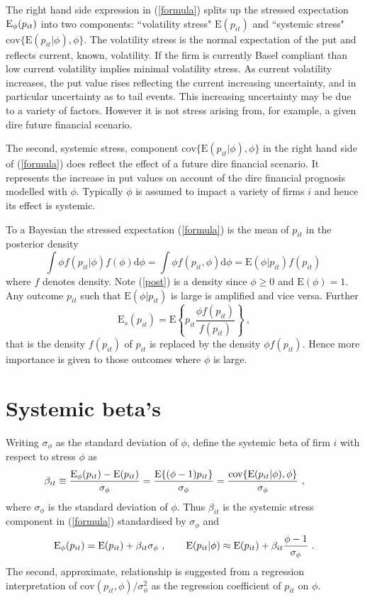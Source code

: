 \documentclass[authoryear]{elsarticle}
\newcommand{\E}{\mathrm{E}}
\newcommand{\cov}{\mathrm{cov}}
\newcommand{\de}{\mathrm{d}}
\newcommand{\eref}[1]{(\ref{#1})}
\newcommand{\cq}{\ , \qquad}
\newcommand{\be}[1]{\begin{equation}\label{#1}}
\newcommand{\ee}{\end{equation}}
\begin{document}
The right hand side expression in \eref{formula} splits up the stressed expectation $\Es(p_{it})$ into two components:   ``volatility stress"  $\E(p_{it})$ and ``systemic stress" $\cov\{\E(p_{it}|\phi),\phi\}$.  The volatility stress is the normal expectation of the put and reflects current, known, volatility.   If the firm is currently Basel compliant than low current volatility implies minimal volatility stress.   As current volatility increases, the put value rises reflecting the current increasing uncertainty, and in particular uncertainty as to tail events.  This increasing uncertainty may be due to a variety of factors.   However it is not  stress arising from, for example, a given dire future financial scenario.

The second, systemic stress, component $\cov\{\E(p_{it}|\phi),\phi\}$ in the right hand side of \eref{formula} does reflect the effect of a future dire financial scenario.  It represents the increase in put values on account of the dire financial prognosis modelled with $\phi$.  Typically $\phi$ is assumed to impact a variety of firms $i$ and hence its effect is systemic.


  To a Bayesian the stressed expectation \eref{formula}  is the mean of $p_{it}$  in  the posterior density
\be{post}
\int \phi f(p_{it}|\phi) f(\phi)\de \phi=\int \phi f(p_{it},\phi)\de \phi= \E(\phi|p_{it})f(p_{it})\ 
\ee
where $f$ denotes density.
Note \eref{post} is a density since $\phi\ge 0$ and $\E(\phi)=1$.   Any outcome $p_{it}$ such that $\E(\phi|p_{it})$ is large  is amplified and vice versa.   Further
$$
\E_s(p_{it})  = \E\left\{p_{it} \frac{\phi f(p_{it})}{f(p_{it})}\right\}\ ,
$$
that is the density  $f(p_{it})$ of $p_{it}$  is replaced by  the density $\phi f(p_{it})$.  Hence more importance is given to those outcomes where $\phi$ is large. 


\section{Systemic beta's}
Writing  $\sigma_{\phi}$ as the standard deviation of $\phi$,  define the systemic beta of firm $i$ with respect to stress $\phi$ as
\be{zscore}
\beta_{it}\equiv \frac{\Es(p_{it})- \E(p_{it})}{\sigma_\phi}= \frac{\E\{(\phi-1)p_{it}\}}{\sigma_\phi}= \frac{ \cov\{\E(p_{it}|\phi),\phi\}}{\sigma_\phi} \cq
\ee
where  $\sigma_\phi$ is the standard deviation of $\phi$.  Thus $\beta_{it}$ is the systemic stress component in \eref{formula} standardised by $\sigma_\phi$ and
\be{zscore2}
\Es(p_{it}) = \E(p_{it}) + \beta_{it}\sigma_\phi\cq \E(p_{it}|\phi) \approx \E(p_{it}) + \beta_{it}\frac{\phi-1}{\sigma_\phi}\ .
\ee
The second, approximate, relationship is suggested from  a regression interpretation of $\cov(p_{it},\phi)/\sigma^2_\phi$ as the regression coefficient of $p_{it}$ on $\phi$.
\end{document}
